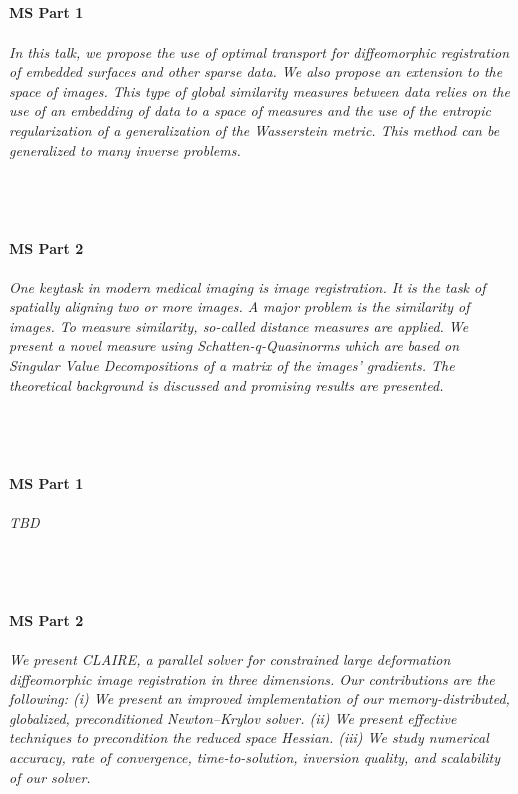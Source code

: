 \begin{multicols}{2}
\\ 
    \\
    \\\\
    \noindent\textbf{MS Part 1}\\
\\  
    \textit{In this talk, we propose the use of optimal transport for diffeomorphic registration of embedded surfaces and other sparse data. We also propose an extension to the space of images. This type of global similarity measures between data relies on the use of an embedding of data to a space of measures and the use of the entropic regularization of a generalization of the Wasserstein metric. This method can be generalized to many inverse problems.}\\
\\ 
    \\
    \\\\
    \noindent\textbf{MS Part 2}\\
\\  
    \textit{One keytask in modern medical imaging is image registration. It is the task of spatially aligning two or more images. A major problem is the similarity of images. To measure similarity, so-called distance measures are applied. We present a novel
measure using Schatten-q-Quasinorms which are based on Singular Value Decompositions of a matrix of the images' gradients.
The theoretical background is discussed and promising results are presented.}\\
\\ 
    \\
    \\\\
    \noindent\textbf{MS Part 1}\\
\\  
    \textit{TBD}\\
\\ 
    \\
    \\\\
    \noindent\textbf{MS Part 2}\\
\\  
    \textit{We present CLAIRE, a parallel solver for constrained large deformation diffeomorphic image registration in three dimensions. Our contributions are the following: (i) We present an improved implementation of our memory-distributed, globalized, preconditioned Newton--Krylov solver. (ii) We present effective techniques to precondition the reduced space Hessian. (iii) We study numerical accuracy, rate of convergence, time-to-solution, inversion quality, and scalability of our solver.
}
\end{multicols}
